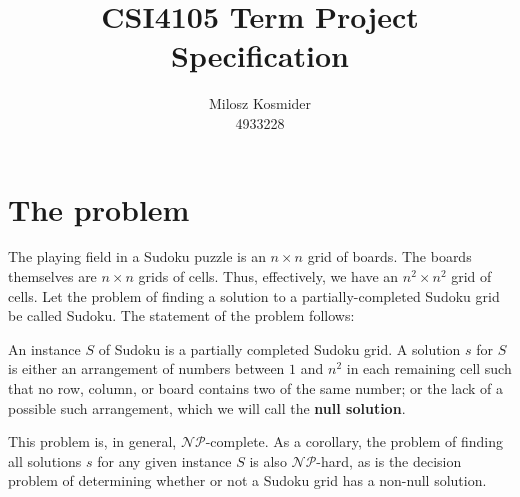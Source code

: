 \documentclass{article}
\title{CSI4105 Term Project Specification}
\author{Milosz Kosmider \\ 4933228}
\begin{document}
\maketitle
\pagestyle{empty}
\thispagestyle{empty}

\section{The problem}
The playing field in a Sudoku puzzle is an $n \times n$ grid of boards. The boards themselves are $n \times n$ grids of cells. Thus, effectively, we have an $n^2 \times n^2$ grid of cells. Let the problem of finding a solution to a partially-completed Sudoku grid be called {\sc Sudoku}. The statement of the problem follows:

An instance $S$ of {\sc Sudoku} is a partially completed Sudoku grid. A solution $s$ for $S$ is either an arrangement of numbers between $1$ and $n^2$ in each remaining cell such that no row, column, or board contains two of the same number; or the lack of a possible such arrangement, which we will call the \textbf{null solution}.

This problem is, in general, $\mathcal{NP}$-complete. As a corollary, the problem of finding all solutions $s$ for any given instance $S$ is also $\mathcal{NP}$-hard, as is the decision problem of determining whether or not a Sudoku grid has a non-null solution.
\end{document}
